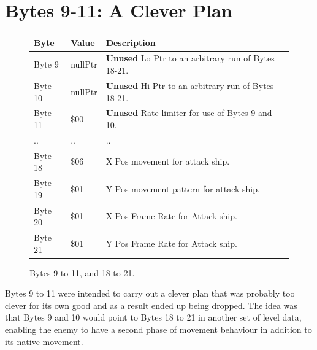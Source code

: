\section{Bytes 9-11: A Clever Plan}
\begin{figure}[H]

  {
    \setlength{\tabcolsep}{3.0pt}
    \setlength\cmidrulewidth{\heavyrulewidth} %
    \begin{adjustbox}{width=10cm}

      \begin{tabular}{lll}
        \toprule
        Byte    & Value                     & Description                                                        \\
        \midrule
        Byte 9  & nullPtr\index{nullPtr}                   & \textbf{Unused} Lo Ptr to an arbitrary run of Bytes 18-21.\\
        Byte 10 & nullPtr\index{nullPtr}                   & \textbf{Unused} Hi Ptr to an arbitrary run of Bytes 18-21.\\
        Byte 11 & \$00                       & \textbf{Unused} Rate limiter for use of Bytes 9 and 10. \\
        .. & ..                       & ..\\
        Byte 18 & \$06                       & X Pos movement\index{movement} for attack ship.                                    \\
        Byte 19 & \$01                       & Y Pos movement\index{movement} pattern\index{pattern} for attack ship.                            \\
        Byte 20 & \$01                       & X Pos Frame Rate for Attack ship.                                  \\
        Byte 21 & \$01                       & Y Pos Frame Rate for Attack ship.                                  \\
        \bottomrule
      \end{tabular}
    \end{adjustbox}
  }\caption{Bytes 9 to 11, and 18 to 21.}
\end{figure}
Bytes 9 to 11 were intended to carry out a clever plan that was probably too clever for its own
good and as a result ended up being dropped. The idea was that Bytes 9 and 10 would point to 
Bytes 18 to 21 in another set of level data, enabling the enemy to have a second phase of movement
behaviour in addition to its native movement.

